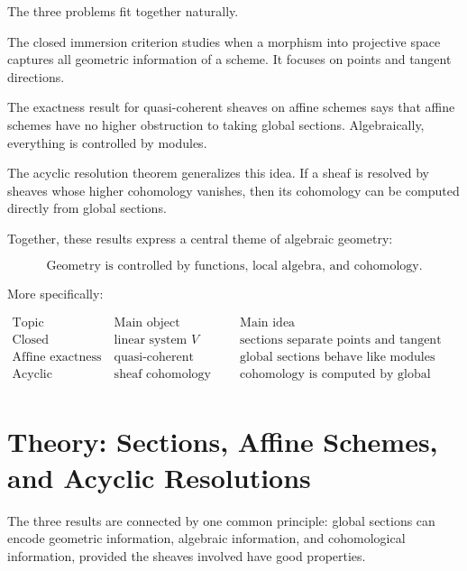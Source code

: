 \documentclass[12pt,a4paper]{article}
\theoremstyle{notespace}
\begin{document}
The three problems fit together naturally.

The closed immersion criterion studies when a morphism into projective space captures all geometric information of a scheme. It focuses on points and tangent directions.

The exactness result for quasi-coherent sheaves on affine schemes says that affine schemes have no higher obstruction to taking global sections. Algebraically, everything is controlled by modules.

The acyclic resolution theorem generalizes this idea. If a sheaf is resolved by sheaves whose higher cohomology vanishes, then its cohomology can be computed directly from global sections.

Together, these results express a central theme of algebraic geometry:

\[
\boxed{
	\text{Geometry is controlled by functions, local algebra, and cohomology.}
}
\]

More specifically:

\[
\begin{array}{c|c|c}
	\text{Topic} & \text{Main object} & \text{Main idea} \\
	\hline
	\text{Closed immersion} & \text{linear system } V & \text{sections separate points and tangent vectors} \\
	\text{Affine exactness} & \text{quasi-coherent sheaves} & \text{global sections behave like modules} \\
	\text{Acyclic resolution} & \text{sheaf cohomology} & \text{cohomology is computed by global sections} \\
\end{array}
\]

\section{Theory: Sections, Affine Schemes, and Acyclic Resolutions}

The three results are connected by one common principle: global sections can encode geometric information, algebraic information, and cohomological information, provided the sheaves involved have good properties.
\end{document}
